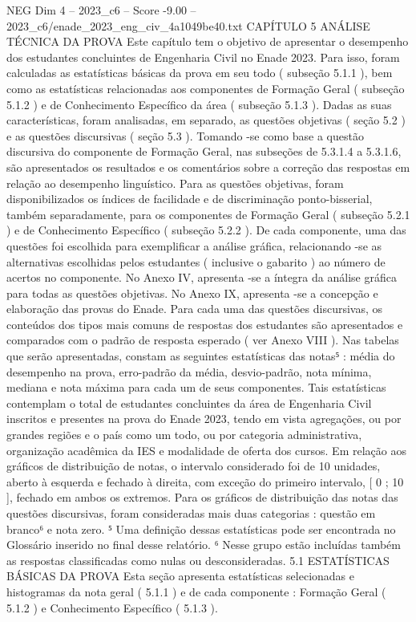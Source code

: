 \begin{textsample}{NEG Dim 4 – 2023\_c6 – Score -9.00 – 2023\_c6/enade\_2023\_eng\_civ\_4a1049be40.txt}  \label{ex:f4_neg_004}
CAPÍTULO 5 ANÁLISE TÉCNICA DA PROVA Este capítulo tem o objetivo de apresentar o desempenho dos estudantes concluintes de Engenharia Civil no Enade 2023.
Para isso, foram calculadas as estatísticas básicas da prova em seu todo ( subseção 5.1.1 ), bem como as estatísticas relacionadas aos componentes de Formação Geral ( subseção 5.1.2 ) e de Conhecimento Específico da área ( subseção 5.1.3 ).
Dadas as suas características, foram analisadas, em separado, as questões objetivas ( seção 5.2 ) e as questões discursivas ( seção 5.3 ).
Tomando -se como base a questão discursiva do componente de Formação Geral, nas subseções de 5.3.1.4 a 5.3.1.6, são apresentados os resultados e os comentários sobre a correção das respostas em relação ao desempenho linguístico.
Para as questões objetivas, foram disponibilizados os índices de facilidade e de discriminação ponto-bisserial, também separadamente, para os componentes de Formação Geral ( subseção 5.2.1 ) e de Conhecimento Específico ( subseção 5.2.2 ).
De cada componente, uma das questões foi escolhida para exemplificar a análise gráfica, relacionando -se as alternativas escolhidas pelos estudantes ( inclusive o gabarito ) ao número de acertos no componente.
No Anexo IV, apresenta -se a íntegra da análise gráfica para todas as questões objetivas.
No Anexo IX, apresenta -se a concepção e elaboração das provas do Enade.
Para cada uma das questões discursivas, os conteúdos dos tipos mais comuns de respostas dos estudantes são apresentados e comparados com o padrão de resposta esperado ( ver Anexo VIII ).
Nas tabelas que serão apresentadas, constam as seguintes estatísticas das notas⁵ : média do desempenho na prova, erro-padrão da média, desvio-padrão, nota mínima, mediana e nota máxima para cada um de seus componentes.
Tais estatísticas contemplam o total de estudantes concluintes da área de Engenharia Civil inscritos e presentes na prova do Enade 2023, tendo em vista agregações, ou por grandes regiões e o país como um todo, ou por categoria administrativa, organização acadêmica da IES e modalidade de oferta dos cursos.
Em relação aos gráficos de distribuição de notas, o intervalo considerado foi de 10 unidades, aberto à esquerda e fechado à direita, com exceção do primeiro intervalo, [ 0 ; 10 ], fechado em ambos os extremos.
Para os gráficos de distribuição das notas das questões discursivas, foram consideradas mais duas categorias : questão em branco⁶ e nota zero. ⁵ Uma definição dessas estatísticas pode ser encontrada no Glossário inserido no final desse relatório. ⁶ Nesse grupo estão incluídas também as respostas classificadas como nulas ou desconsideradas. 5.1 ESTATÍSTICAS BÁSICAS DA PROVA Esta seção apresenta estatísticas selecionadas e histogramas da nota geral ( 5.1.1 ) e de cada componente : Formação Geral ( 5.1.2 ) e Conhecimento Específico ( 5.1.3 ).

\end{textsample}
